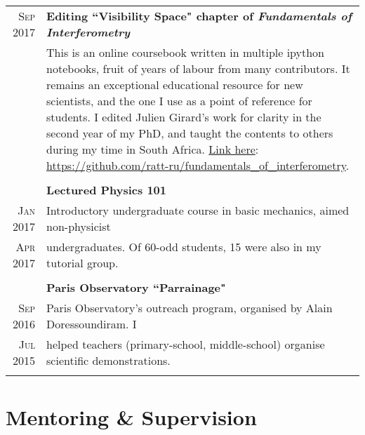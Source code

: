 \documentclass[10pt]{article} %
\begin{document}
\begin{tabular}{r|p{12.5cm}}
	\textsc{Sep 2017} & \textbf{Editing ``Visibility Space" chapter of \emph{Fundamentals of Interferometry}}\\
	& This is an online coursebook written in multiple ipython notebooks, fruit of years of labour from many contributors. It remains an exceptional educational resource for new scientists, and the one I use as a point of reference for students. I edited Julien Girard's work for clarity in the second year of my PhD, and taught the contents to others during my time in South Africa. \hyperlink{https://github.com/ratt-ru/fundamentals_of_interferometry}{Link here}: \url{https://github.com/ratt-ru/fundamentals_of_interferometry}.\\                  
	\multicolumn{2}{c}{} \\

	& \textbf{Lectured Physics 101}\vspace{1mm}\\
	\textsc{Jan 2017} & Introductory undergraduate course in basic mechanics, aimed non-physicist\\
	\textsc{Apr 2017} & undergraduates. Of 60-odd students, 15 were also in my tutorial group.\\
	\multicolumn{2}{c}{} \\	

	
	& \textbf{Paris Observatory ``Parrainage"}\vspace{1mm}\\
	\textsc{Sep 2016} & Paris Observatory’s outreach program, organised by Alain Doressoundiram. I\\
	\textsc{Jul 2015} & helped teachers (primary-school, middle-school) organise scientific demonstrations.\\
	\multicolumn{2}{c}{} \\	
	
\end{tabular}


\section{Mentoring \& Supervision}
\end{document}
